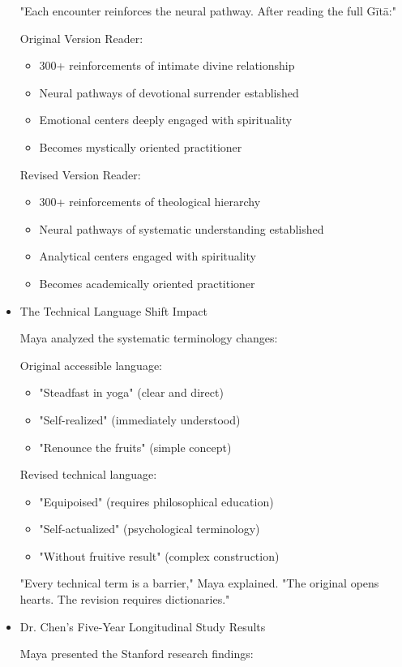 \documentclass[11pt,twoside]{book}
\begin{document}
\begin{itemize}
"Each encounter reinforces the neural pathway. After reading the full Gītā:"

Original Version Reader:
\begin{itemize}
\item 300+ reinforcements of intimate divine relationship
\item Neural pathways of devotional surrender established
\item Emotional centers deeply engaged with spirituality
\item Becomes mystically oriented practitioner
\end{itemize}

Revised Version Reader:
\begin{itemize}
\item 300+ reinforcements of theological hierarchy
\item Neural pathways of systematic understanding established
\item Analytical centers engaged with spirituality
\item Becomes academically oriented practitioner
\end{itemize}
\item The Technical Language Shift Impact
\label{sec:org883fa5d}

Maya analyzed the systematic terminology changes:

Original accessible language:
\begin{itemize}
\item "Steadfast in yoga" (clear and direct)
\item "Self-realized" (immediately understood)
\item "Renounce the fruits" (simple concept)
\end{itemize}

Revised technical language:
\begin{itemize}
\item "Equipoised" (requires philosophical education)
\item "Self-actualized" (psychological terminology)
\item "Without fruitive result" (complex construction)
\end{itemize}

"Every technical term is a barrier," Maya explained. "The original opens hearts. The revision requires dictionaries."
\item Dr. Chen's Five-Year Longitudinal Study Results
\label{sec:org2695312}

Maya presented the Stanford research findings:


\end{itemize}
\end{document}
